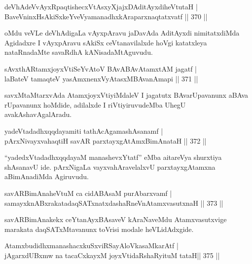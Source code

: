 \begin{shl}
deVhAdeVvAyxRpaqtishecxVtAsxyXjajxDAditAyxdiheVtutaH | \\
BaveVninxHsAkiSxkeYveVyamanadhxkAraparxnaqtatxvatf \hfill||  370 || 
\end{shl}

\begin{artha}
oMdu veVLe deVhAdigaLa vAyxpAravu jaDavAda AditAyxdi nimitatxdiMda Agidadxre I vAyxpAravu sAkiSx ceVtanavilalxde hoVgi katatxleya nataRnadaMte savaRdhA kANisadaMtAguvudu.
\end{artha}

\begin{shl}
sAvxthARtamxjoyxVtiSeYvAtoV BAvABAvAtamxtAM jagatf | \\
laBateV tamaqteV yasAmxnenxVyAtasxMBAvanAmapi \hfill||  371 ||  
\end{shl}

\begin{artha}
savxMtaMtarxvAda AtamxjoyxVtiyiMdaleV I jagatutx BAvarUpavanunx aBAva rUpavanunx hoMdide, adilalxde I riVtiyiruvudeMba UhegU avakAshavAgalAradu.
\end{artha}


\begin{shl}
yadeVtadadhxqqdayamiti tathAcA\s \s gamashAsanamf | \\
pArxNivayxvahaqtiH savAR parxtayxgAtAmxBimAnataH \hfill||  372 ||  
\end{shl}

\begin{artha}
``yadedxVtadadhxqqdayaM manashevxYtatf'' eMba aitareVya shurxtiya shAsanavU ide. pArxNigaLa vayxvahAravelalxvU parxtayxgAtamxna aBimAnadiMda Agiruvudu.
\end{artha}

\begin{shl}
savARBimAnaheVtuM ca cidABAsaM purA\s barxvamf | \\
samayxknABxrakatadaqSATxnatxdashaRneVnA\s \s tamxvasutxnaH \hfill||  373 ||  
\end{shl}

\begin{artha}
savARBimAnakekx ceYtanAyxBAsaveV kAraNaveMdu Atamxvasutxvige marakata daqSATxMtavanunx toVrisi modale heVLidAdxgide.
\end{artha}


\begin{shl}
AtamxbudidhxmanashacxkuSxviRSayAloVkasaMkarAtf | \\
jAgarxdUBxmw na tacaCxkayxM joyxVtidaRshaRyituM tataH\hfill ||  375 ||  
\end{shl}

